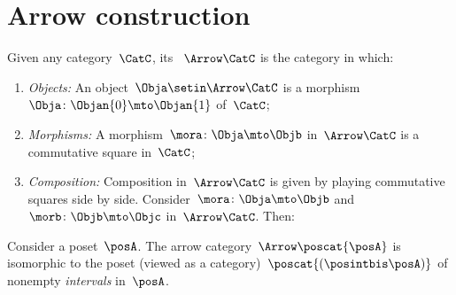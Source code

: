 
\section{Arrow construction}


\begin{ctdefinition}
    \label{def:arrow_category}
    Given any category~$\CatC$, its \emph{}~$\Arrow\CatC$ is the category in which:
    \begin{enumerate}
        \item \emph{Objects:} An object~$\Obja \setin \Arrow\CatC$ is a morphism~$\Obja\colon \Objan{0}\mto \Objan{1}$ of~$\CatC$;
        \item \emph{Morphisms:} A morphism~$\mora\colon \Obja \mto \Objb$ in~$\Arrow\CatC$ is a commutative square in~$\CatC$;
        \item \emph{Composition:} Composition in~$\Arrow \CatC$ is given by playing commutative squares side by side.
              Consider~$\mora\colon \Obja \mto \Objb$ and~$\morb\colon \Objb \mto \Objc$ in~$\Arrow\CatC$.
              Then:
    \end{enumerate}
\end{ctdefinition}

\begin{example}[Intervals]
    \label{exa:arrow-poset}
    Consider a poset~$\posA$.
    The arrow category~$\Arrow \poscat{\posA}$ is isomorphic to the poset (viewed as a category)~$\poscat{\left(\posintbis\posA\right)}$ of nonempty \emph{intervals} in~$\posA$.
\end{example}


